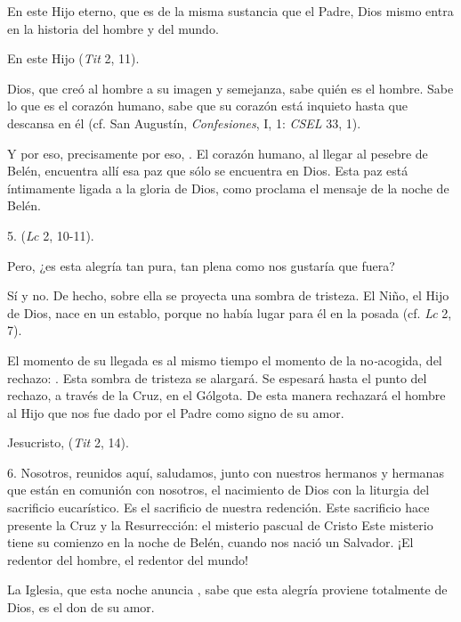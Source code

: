 \begin{body}
\begin{body}
		En este Hijo eterno, que es de la misma sustancia que el Padre, Dios mismo entra en la historia del hombre y del mundo.

		En este Hijo  (\emph{Tit} 2, 11).

		Dios, que creó al hombre a su imagen y semejanza, sabe quién es el hombre. Sabe lo que es el corazón humano, sabe que su corazón está inquieto hasta que descansa en él (cf. San Augustín, \emph{Confesiones}, I, 1: \emph{CSEL} 33, 1).

		Y por eso, precisamente por eso, . El corazón humano, al llegar al pesebre de Belén, encuentra allí esa paz que sólo se encuentra en Dios. Esta paz está íntimamente ligada a la gloria de Dios, como proclama el mensaje de la noche de Belén.

		5.  (\emph{Lc} 2, 10-11).

		Pero, ¿es esta alegría tan pura, tan plena como nos gustaría que fuera?

		Sí y no. De hecho, sobre ella se proyecta una sombra de tristeza. El Niño, el Hijo de Dios, nace en un establo, porque no había lugar para él en la posada (cf. \emph{Lc} 2, 7).

		El momento de su llegada es al mismo tiempo el momento de la no\emph{-}acogida, del rechazo: . Esta sombra de tristeza se alargará. Se espesará hasta el punto del rechazo, a través de la Cruz, en el Gólgota. De esta manera rechazará el hombre al Hijo que nos fue dado por el Padre como signo de su amor.

		Jesucristo,  (\emph{Tit} 2, 14).

		6. Nosotros, reunidos aquí, saludamos, junto con nuestros hermanos y hermanas que están en comunión con nosotros, el nacimiento de Dios con la liturgia del sacrificio eucarístico. Es el sacrificio de nuestra redención. Este sacrificio hace presente la Cruz y la Resurrección: el misterio pascual de Cristo Este misterio tiene su comienzo en la noche de Belén, cuando nos nació un Salvador. ¡El redentor del hombre, el redentor del mundo!

		La Iglesia, que esta noche anuncia , sabe que esta alegría proviene totalmente de Dios, es el don de su amor.


\end{body}
\end{body}
